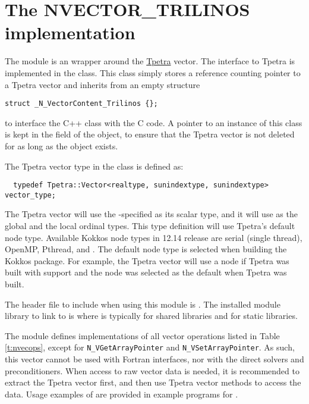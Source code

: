 %
\section{The NVECTOR\_TRILINOS implementation}\label{ss:nvec_trilinos}

The {\nvectrilinos} module is an {\nvector} wrapper around the {\trilinos}
\href{https://github.com/trilinos/Trilinos}{Tpetra} vector. The interface
to Tpetra is implemented in the  class. This
class simply stores a reference counting pointer to a Tpetra vector and
inherits from an empty structure
\begin{verbatim}
struct _N_VectorContent_Trilinos {};
\end{verbatim}
to interface the C++ class with the {\nvector} C code.
A pointer to an instance of this class is kept in the  field
of the  object, to ensure that the Tpetra vector
is not deleted for as long as the  object exists.

The Tpetra vector type in the  class is defined
as:
\begin{verbatim}
  typedef Tpetra::Vector<realtype, sunindextype, sunindextype> vector_type;
\end{verbatim}
The Tpetra vector will use the {\sundials}-specified  as its scalar
type, and it will use  as the global and the local ordinal types.
This type definition will use Tpetra's default node type. Available Kokkos node
types in {\trilinos} 12.14 release are serial (single thread), OpenMP, Pthread,
and {\cuda}. The default node type is selected when building the Kokkos package.
For example, the Tpetra vector will use a {\cuda} node if Tpetra was built with
{\cuda} support and the {\cuda} node was selected as the default when Tpetra was
built.

The header file to include when using this module is .
The installed module library to link to is
where  is typically  for shared libraries and 
for static libraries.


The {\nvectrilinos} module defines implementations of all vector operations listed
in Table \ref{t:nvecops}, except for \verb|N_VGetArrayPointer| and
\verb|N_VSetArrayPointer|. As such, this vector cannot be used with {\sundials} Fortran interfaces, nor with the {\sundials} direct solvers and preconditioners.
When access to raw vector data is needed, it is
recommended to extract the {\trilinos} Tpetra vector first, and then use Tpetra vector
methods to access the data. Usage examples of {\nvectrilinos} are provided in
example programs for {\ida} \cite{ida_ex}.

